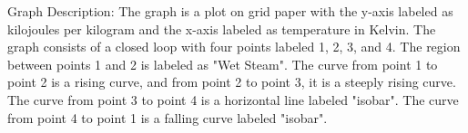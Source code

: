 Graph Description: The graph is a plot on grid paper with the y-axis labeled as kilojoules per kilogram and the x-axis labeled as temperature in Kelvin. The graph consists of a closed loop with four points labeled 1, 2, 3, and 4. The region between points 1 and 2 is labeled as "Wet Steam". The curve from point 1 to point 2 is a rising curve, and from point 2 to point 3, it is a steeply rising curve. The curve from point 3 to point 4 is a horizontal line labeled "isobar". The curve from point 4 to point 1 is a falling curve labeled "isobar".